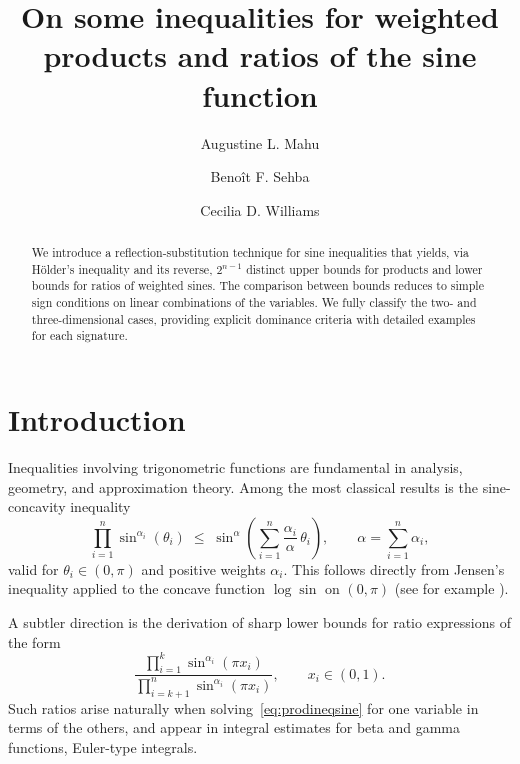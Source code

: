 \documentclass[12pt]{amsart}
\title[On Some Weighted Sine Inequalities]{On some inequalities for weighted products and ratios of the sine function}
\author {Augustine L. Mahu}
\author {Beno\^it F. Sehba}
\author {Cecilia D. Williams}
\theoremstyle{definition}
\begin{document}

\begin{abstract}
We introduce a reflection-substitution technique for sine inequalities that yields, via H\"older's inequality and its reverse, $2^{n-1}$ distinct upper bounds for products and lower bounds for ratios of weighted sines. The comparison between bounds reduces to simple sign conditions on linear combinations of the variables. We fully classify the two- and three-dimensional cases, providing explicit dominance criteria with detailed examples for each signature.
\end{abstract}

\maketitle


\thispagestyle{empty}


\section{Introduction}

Inequalities involving trigonometric functions are fundamental in analysis, geometry, and approximation theory. Among the most classical results is the sine-concavity inequality
\begin{equation}\label{eq:prodineqsine}
  \prod_{i=1}^{n}\sin^{\alpha_i}(\theta_i)
  \;\leq\;
  \sin^{\alpha}\!\left(\sum_{i=1}^n\frac{\alpha_i}{\alpha}\,\theta_i\right),
  \qquad
  \alpha=\sum_{i=1}^n\alpha_i,
\end{equation}
valid for $\theta_i\in(0,\pi)$ and positive weights $\alpha_i$. This follows directly from Jensen's inequality applied to the concave function $\log\sin$ on $(0,\pi)$ (see for example \cite{Bullen2003,Mitrinovic1970,MPF1993}).

A subtler direction is the derivation of sharp lower bounds for ratio expressions of the form
\begin{equation}\label{eq:ratioform}
  \frac{\displaystyle\prod_{i=1}^{k}\sin^{\alpha_i}(\pi x_i)}{\displaystyle\prod_{i=k+1}^{n}\sin^{\alpha_i}(\pi x_i)},
  \qquad x_i\in(0,1).
\end{equation}
Such ratios arise naturally when solving~\eqref{eq:prodineqsine} for one variable in terms of the others, and appear in integral estimates for beta and gamma functions, Euler-type integrals.
\end{document}
